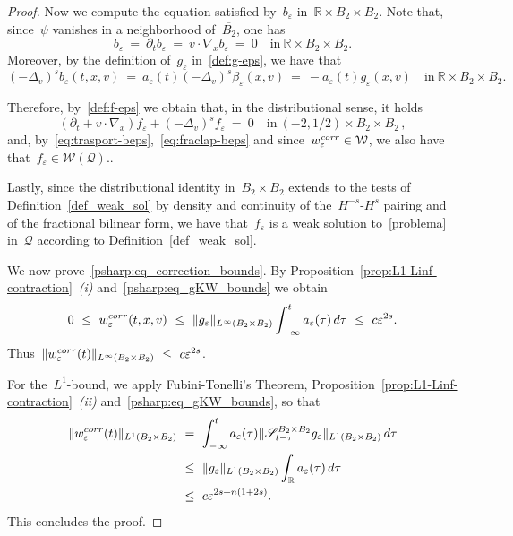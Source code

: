 \documentclass[leqno,10pt]{amsart}
\theoremstyle{plain}
\theoremstyle{remark}
\numberwithin{equation}{section}
\def \d{\,{\rm d}}
\def\er{\mathbb{R}}
\newcommand{\Wc}{\mathcal{W}}
\newcommand{\eps}{\varepsilon}
\begin{document}
{\begin{proof}
Now we compute the equation satisfied by~$b_\eps$ in~$\er\times B_2\times B_2$. Note that, since~$\psi$ vanishes in a neighborhood of~$\overline{B_2}$, one has
\begin{equation}\label{eq:trasport-beps}
b_\eps \ = \  \partial_tb_\eps \ = \ v\cdot\nabla_xb_\eps \ = \ 0
\quad
\text{in}~\er \times B_2\times B_2.
\end{equation}
Moreover, by the definition of~$g_\eps$ in~\eqref{def:g-eps}, we have that
\begin{equation}\label{eq:fraclap-beps}
(-\Delta_v)^sb_\eps(t,x,v) \ = \  a_\eps(t)(-\Delta_v)^s\beta_\eps(x,v) \ = \ 
- a_\eps(t)g_\eps(x,v) \quad \text{in}~\er \times B_2 \times B_2.
\end{equation}

Therefore, by~\eqref{def:f-eps} we obtain that, in the distributional sense, it holds
\[
(\partial_t+v\cdot\nabla_x)f_\eps+(-\Delta_v)^sf_\eps \ = \ 0
\quad
\text{in}~(-2,1/2)\times B_2\times B_2\,,
\]
and, by~\eqref{eq:trasport-beps},~\eqref{eq:fraclap-beps} and since~$w_\eps^{\it corr} \in \Wc$, we also have 
that~$f_\eps\in\Wc(\mathcal{Q})$.. 

Lastly, since the distributional identity in~$B_2\times B_2$
extends to the tests of Definition~\ref{def_weak_sol} by density and
continuity of the~$H^{-s}$-$H^s$ pairing and of the fractional bilinear
form, we have that~$f_\eps$ is a weak solution to~\eqref{problema} in~$\mathcal{Q}$ according to Definition~\ref{def_weak_sol}.

We now prove~\eqref{psharp:eq_correction_bounds}.  By Proposition~\ref{prop:L1-Linf-contraction}~{\it (i)} and~\eqref{psharp:eq_gKW_bounds} we obtain
\[
0\ \leq\ w_\eps^{\rm corr}(t,x,v)
\ \leq\ \|g_\eps\|_{L^\infty(B_2\times B_2)}
 \int_{-\infty}^ta_\eps(\tau)\d\tau \ \leq\ c\eps^{2s}.
\]
Thus~$\|w_\eps^{\rm corr}(t)\|_{L^\infty(B_2\times B_2)}\ \leq\  c\eps^{2s}$.

 For the~$L^1$-bound, we apply Fubini-Tonelli's Theorem, Proposition~\ref{prop:L1-Linf-contraction}~{\it (ii)} and~\eqref{psharp:eq_gKW_bounds}, so that 
\[
\begin{aligned}
\|w_\eps^{\rm corr}(t)\|_{L^1(B_2\times B_2)}
& \ = \ \int_{-\infty}^ta_\eps(\tau)
 \|\mathscr{S}_{t-\tau}^{B_2\times B_2}g_\eps\|_{L^1(B_2\times B_2)}\d\tau
\\
&\ \leq\ \|g_\eps\|_{L^1(B_2\times B_2)}
 \int_{\mathbb{R}}a_\eps(\tau)\d\tau
\\
&\ \leq\ c\eps^{2s+n(1+2s)}.
\end{aligned}
\]
This concludes the proof. 
\end{proof}




}
\end{document}
